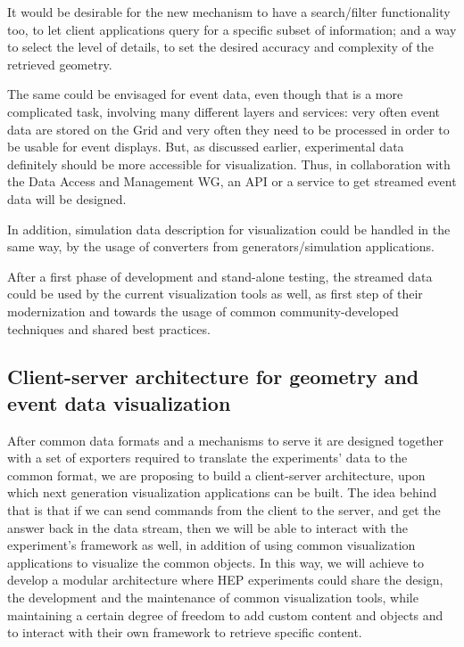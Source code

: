 \documentclass[12pt,a4paper]{article}
\begin{document}
It would be desirable for the new mechanism to have a search/filter functionality too, to let client applications query for a specific subset of information; and a way to select the level of details, to set the desired accuracy and complexity of the retrieved geometry.

The same could be envisaged for event data, even though that is a more complicated task, involving many different layers and services: very often event data are stored on the Grid and very often they need to be processed in order to be usable for event displays.
But, as discussed earlier, experimental data definitely should be more accessible for visualization. Thus, in collaboration with the Data Access and Management WG, an API or a service to get streamed event data will be designed.

In addition, simulation data description for visualization could be handled in the same way, by the usage of converters from generators/simulation applications.

After a first phase of development and stand-alone testing, the streamed data could be used by the current visualization tools as well, as first step of their modernization and towards the usage of common community-developed techniques and shared best practices.

\hypertarget{client-server}{%
\subsection{Client-server architecture for geometry and event data visualization}\label{client-server}}

After common data formats and a mechanisms to serve it are designed together with a set of exporters required to translate the experiments’ data to the common format, we are proposing to build a client-server architecture, upon which next generation visualization applications can be built.
The idea behind that is that if we can send commands from the client to the server, and get the answer back in the data stream, then we will be able to interact with the experiment’s framework as well, in addition of using common visualization applications to visualize the common objects. In this way, we will achieve to develop a modular architecture where HEP experiments could share the design, the development and the maintenance of common visualization tools, while maintaining a certain degree of freedom to add custom content and objects and to interact with their own framework to retrieve specific content.
\end{document}
